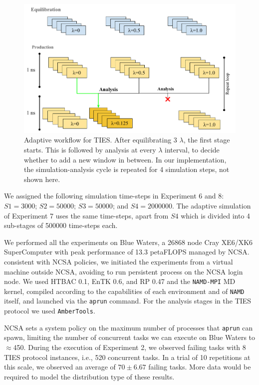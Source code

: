 \begin{figure}
  \centering
  \includegraphics[width=\columnwidth]{figures/Adaptive_TIES.pdf}
  \caption{Adaptive workflow for TIES. After equilibrating 3 
  $\lambda$, the first stage starts. This is followed by analysis at every
  $\lambda$ interval, to decide whether to add a new window in between. In
  our implementation, the simulation-analysis cycle is repeated for 4
  simulation steps, not shown here.}\label{fig:adaptive_TIES}
\up{}
\up{}
\up{}
\end{figure}

We assigned the following simulation time-steps in Experiment 6 and 8:
$S1=3000$; $S2=50000$; $S3=50000$; and $S4=2000000$. The adaptive simulation
of Experiment 7 uses the same time-steps, apart from $S4$ which is divided
into 4 sub-stages of 500000 time-steps each.

We performed all the experiments on Blue Waters, a 26868 node Cray XE6/XK6
SuperComputer with peak performance of 13.3 petaFLOPS managed by NCSA.
consistent with NCSA policies, we initiated the experiments from a virtual
machine outside NCSA, avoiding to run persistent process on the NCSA login
node. We used HTBAC 0.1, EnTK 0.6, and RP 0.47 and the \texttt{NAMD-MPI} MD
kernel, compiled according to the capabilities of each environment and of
\texttt{NAMD} itself, and launched via the \texttt{aprun} command. For the
analysis stages in the TIES protocol we used \texttt{AmberTools}.

NCSA sets a system policy on the maximum number of processes that
\texttt{aprun} can spawn, limiting the number of concurrent tasks we can
execute on Blue Waters to $\approx$450. During the execution of Experiment 2,
we observed failing tasks with 8 TIES protocol instances, i.e., 520
concurrent tasks. In a trial of 10 repetitions at this scale, we observed an
average of $70\pm6.67$ failing tasks.%
More data would be required to model the distribution type of these results.

